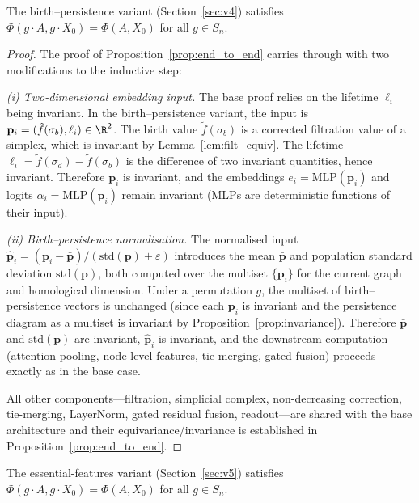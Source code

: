 \begin{proposition}
\label{prop:v4_invariance}
The birth--persistence variant (Section~\ref{sec:v4}) satisfies $\Phi(g \cdot A, g \cdot X_0) = \Phi(A, X_0)$ for all $g \in S_n$.
\end{proposition}

\begin{proof}
The proof of Proposition~\ref{prop:end_to_end} carries through with two modifications to the inductive step:

\emph{(i) Two-dimensional embedding input.}
The base proof relies on the lifetime $\ell_i$ being invariant. In the birth--persistence variant, the input is $\mathbf{p}_i = (\tilde{f}(\sigma_b), \ell_i) \in \R^2$. The birth value $\tilde{f}(\sigma_b)$ is a corrected filtration value of a simplex, which is invariant by Lemma~\ref{lem:filt_equiv}. The lifetime $\ell_i = \tilde{f}(\sigma_d) - \tilde{f}(\sigma_b)$ is the difference of two invariant quantities, hence invariant. Therefore $\mathbf{p}_i$ is invariant, and the embeddings $e_i = \mathrm{MLP}(\mathbf{p}_i)$ and logits $\alpha_i = \mathrm{MLP}(\mathbf{p}_i)$ remain invariant (MLPs are deterministic functions of their input).

\emph{(ii) Birth--persistence normalisation.}
The normalised input $\hat{\mathbf{p}}_i = (\mathbf{p}_i - \bar{\mathbf{p}}) / (\mathrm{std}(\mathbf{p}) + \varepsilon)$ introduces the mean $\bar{\mathbf{p}}$ and population standard deviation $\mathrm{std}(\mathbf{p})$, both computed over the multiset $\{\mathbf{p}_i\}$ for the current graph and homological dimension. Under a permutation $g$, the multiset of birth--persistence vectors is unchanged (since each $\mathbf{p}_i$ is invariant and the persistence diagram as a multiset is invariant by Proposition~\ref{prop:invariance}). Therefore $\bar{\mathbf{p}}$ and $\mathrm{std}(\mathbf{p})$ are invariant, $\hat{\mathbf{p}}_i$ is invariant, and the downstream computation (attention pooling, node-level features, tie-merging, gated fusion) proceeds exactly as in the base case.

All other components---filtration, simplicial complex, non-decreasing correction, tie-merging, LayerNorm, gated residual fusion, readout---are shared with the base architecture and their equivariance/invariance is established in Proposition~\ref{prop:end_to_end}.
\end{proof}

\begin{proposition}
\label{prop:v5_invariance}
The essential-features variant (Section~\ref{sec:v5}) satisfies $\Phi(g \cdot A, g \cdot X_0) = \Phi(A, X_0)$ for all $g \in S_n$.
\end{proposition}

